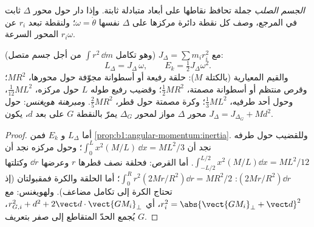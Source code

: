 \begin{definition}\label{def:b1:systems-of-points:solid}
\emph{الجسم الصلب} جملة تحافظ نقاطها على أبعاد متبادلة
ثابتة. وإذا دار حول محور $\Delta$ ثابت في المرجع، وصف كل
نقطة دائرة مركزها على $\Delta$  نفسها
$\omega = \dot\theta$؛ ولنقطة تبعد $r_i$ عن المحور السرعة
$r_i\omega$.
\end{definition}

\begin{proposition}\label{prop:b1:systems-of-points:inertia}
مع \emph{} $J_\Delta = \sum m_ir_i^2$ (وهو تكامل
$\int r^2\,\dd m$ من أجل جسم متصل):
\[
L_\Delta = J_\Delta\,\omega, \qquad E_k = \tfrac12 J_\Delta\omega^2 .
\]
والقيم المعيارية (بالكتلة $M$): حلقة رفيعة أو أسطوانة مجوّفة حول محورها،
$MR^2$؛ وقرص منتظم أو أسطوانة مصمتة، $\tfrac12 MR^2$؛ وقضيب رفيع
طوله $L$ حول مركزه، $\tfrac{1}{12}ML^2$، وحول أحد طرفيه،
$\tfrac13 ML^2$؛ وكرة مصمتة حول قطر، $\tfrac25 MR^2$.
و\emph{مبرهنة هويغنس}: حول محور $\Delta$ مواز لمحور
$\Delta_G$ يمرّ بالنقطة $G$ على بعد $d$، يكون $J_\Delta = J_{\Delta_G} + Md^2$.
\end{proposition}

\begin{proof}
أما $L_\Delta$ و $E_k$ فمن \cref{prop:b1:angular-momentum:inertia}.
وللقضيب حول طرفه نجد أن
$\int_0^L x^2(M/L)\,\dd x = ML^2/3$؛ وحول مركزه نجد أن
$\int_{-L/2}^{L/2} x^2(M/L)\dd x = ML^2/12$. أما القرص: فحلقة نصف قطرها $r$
وعرضها $\dd r$ وكتلتها
$(2Mr/R^2)\dd r$: $\int_0^R r^2(2Mr/R^2)\dd r = MR^2/2$؛ أما الحلقة
والكرة فمقبولتان (إذ تحتاج الكرة إلى تكامل مضاعف). ولهويغنس: مع
$r_i^2 = \abs{\vect{GM_i}_\perp + \vect d}^2$، أي $r_{G,i}^2 + d^2 + 2\vect d\cdot
\vect{GM_i}_\perp$، يُجمع الحدّ المتقاطع إلى صفر بتعريف $G$.
\end{proof}

